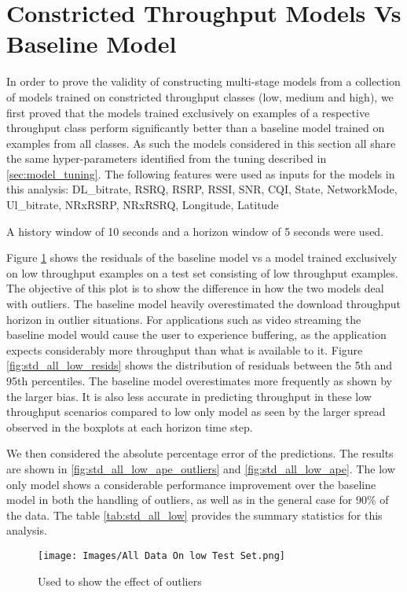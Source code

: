 \newpage
\section{Constricted Throughput Models Vs Baseline Model}
\label{sec:initial_hypo}
In order to prove the validity of constructing multi-stage models from a collection of models trained on constricted throughput classes (low, medium and high), we first proved that the models trained exclusively on examples of a respective throughput class perform significantly better than a baseline model trained on examples from all classes. As such the models considered in this section all share the same hyper-parameters identified from the tuning described in \ref{sec:model_tuning}. The following features were used as inputs for the models in this analysis: DL\_bitrate, RSRQ, RSRP, RSSI, SNR, CQI, State, NetworkMode, Ul\_bitrate, NRxRSRP, NRxRSRQ, Longitude, Latitude

A history window of 10 seconds and a horizon window of 5 seconds were used.

Figure \ref{fig:std_all_low_resids_outliers} shows the residuals of the baseline model vs a model trained exclusively on low throughput examples on a test set consisting of low throughput examples. The objective of this plot is to show the difference in how the two models deal with outliers. The baseline model heavily overestimated the download throughput horizon in outlier situations. For applications such as video streaming the baseline model would cause the user to experience buffering, as the application expects considerably more throughput than what is available to it. Figure \ref{fig:std_all_low_resids} shows the distribution of residuals between the 5th and 95th percentiles. The baseline model overestimates more frequently as shown by the larger bias. It is also less accurate in predicting throughput in these low throughput scenarios compared to low only model as seen by the larger spread observed in the boxplots at each horizon time step.

We then considered the absolute percentage error of the predictions. The results are shown in \ref{fig:std_all_low_ape_outliers} and \ref{fig:std_all_low_ape}. The low only model shows a considerable performance improvement over the baseline model in both the handling of outliers, as well as in the general case for 90\% of the data. The table \ref{tab:std_all_low} provides the summary statistics for this analysis.

\begin{figure}[H]
\texttt{[image: Images/All Data On low Test Set.png]}
\centering
\caption{Used to show the effect of outliers}
\label{fig:std_all_low_resids_outliers}
\end{figure}

